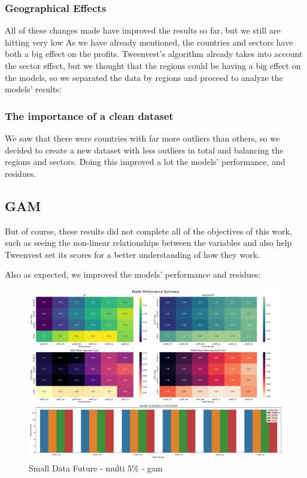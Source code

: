 \documentclass[11pt,english,a4paper,hidelinks]{book}
\begin{document}
\subsubsection{Geographical Effects}

All of these changes made have improved the results so far, but we still are hitting very low 
\noindent As we have already mentioned, the countries and sectors have both a big effect on the profits. Tweenvest's algorithm already takes into account the sector effect, but we thought that the regions could be having a big effect on the models, so we separated the data by regions and proceed to analyze the models' results:


\subsubsection{The importance of a clean dataset}

\noindent We saw that there were countries with far more outliers than others, so we decided to create a new dataset with less outliers in total and balancing the regions and sectors. Doing this improved a lot the models' performance, and residues.


\subsection{GAM}

\noindent But of course, these results did not complete all of the objectives of this work, such as seeing the non-linear relationships between the variables and also help Tweenvest set its scores for a better understanding of how they work.

\vspace{0.5cm}
\noindent Also as expected, we improved the models' performance and residues:

\begin{figure}[H]
    \centering
    \includegraphics[width=1\textwidth]{images/code/models/general_regression/Small Data future - IF_performance.png}
    \caption{Small Data Future - \acrshort{multi} 5\% - \acrshort{gam}}
    \label{fig:gam_linear_regression}
\end{figure}
\end{document}
